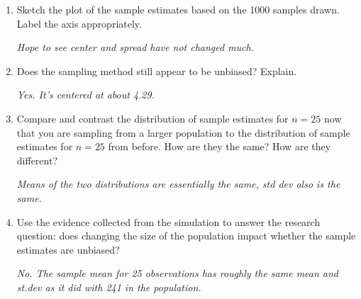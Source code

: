 \begin{enumerate}
     \item  Sketch the plot of the sample estimates based on the 1000
       samples drawn. Label the axis appropriately. 
       \begin{students}
  \vspace{3cm}
\end{students}    
\begin{key}
   {\it  Hope to see center and spread have not changed much.}
\end{key}


     \item  Does the sampling method still appear to be unbiased?
       Explain.
       \begin{students}
  \vspace{3cm}
\end{students}    
\begin{key}
   {\it  Yes.  It's centered at about 4.29.}
\end{key}

     \item Compare and contrast the distribution of sample estimates
       for $n = 25$ now that you are sampling from a larger population
       to the distribution of sample estimates for $n = 25$ from
       before. How are they the same? How are they different?
       \begin{students}
  \vspace{3cm}
\end{students}    
\begin{key}
   {\it  Means of the two distributions are essentially the same, std dev
     also is the same.}
\end{key}

     \item Use the evidence collected from the simulation to answer
       the research question: does changing the size of the population
       impact whether the sample estimates are unbiased?
       \begin{students}
  \vspace{4cm}
\end{students}    
\begin{key}
   {\it  No.  The sample mean for 25 observations has roughly the same
     mean and st.dev as it did with 241 in the population.}
\end{key}


\end{enumerate}
